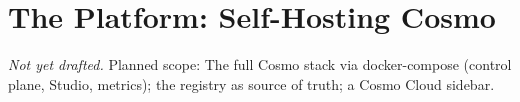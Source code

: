 \chapter{The Platform: Self-Hosting Cosmo}
\label{ch:self-hosting-cosmo}

\emph{Not yet drafted.} Planned scope: The full Cosmo stack via docker-compose (control plane, Studio, metrics); the registry as source of truth; a Cosmo Cloud sidebar.

% 

